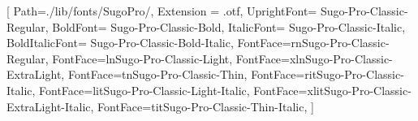 \setmainfont{SugoPro}[
    Path=./lib/fonts/SugoPro/,
    Extension = .otf,
    UprightFont=     Sugo-Pro-Classic-Regular,
    BoldFont=        Sugo-Pro-Classic-Bold,
    ItalicFont=      Sugo-Pro-Classic-Italic,
    BoldItalicFont=  Sugo-Pro-Classic-Bold-Italic,
    FontFace={r}{n}{Sugo-Pro-Classic-Regular},
    FontFace={l}{n}{Sugo-Pro-Classic-Light},
    FontFace={xl}{n}{Sugo-Pro-Classic-ExtraLight},
    FontFace={t}{n}{Sugo-Pro-Classic-Thin},
    FontFace={r}{it}{Sugo-Pro-Classic-Italic},
    FontFace={l}{it}{Sugo-Pro-Classic-Light-Italic},
    FontFace={xl}{it}{Sugo-Pro-Classic-ExtraLight-Italic},
    FontFace={t}{it}{Sugo-Pro-Classic-Thin-Italic},
    ]
\newcommand{\regular}[1]{%
    {\rmfamily \fontseries{r}\selectfont #1}
}
\newcommand{\light}[1]{%
    {\rmfamily \fontseries{l}\selectfont #1}
}
\newcommand{\extralight}[1]{%
    {\rmfamily \fontseries{xl}\selectfont #1}
}
\newcommand{\thin}[1]{%
    {\rmfamily \fontseries{t}\selectfont #1}
}


%
